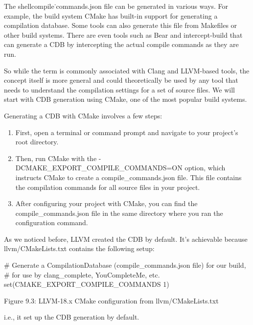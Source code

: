 The shellcompile˙commands.json file can be generated in various ways. For example, the build system CMake has built-in support for generating a compilation database. Some tools can also generate this file from Makefiles or other build systems. There are even tools such as Bear and intercept-build that can generate a CDB by intercepting the actual compile commands as they are run.

So while the term is commonly associated with Clang and LLVM-based tools, the concept itself is more general and could theoretically be used by any tool that needs to understand the compilation settings for a set of source files. We will start with CDB generation using CMake, one of the most popular build systems.


Generating a CDB with CMake involves a few steps:

\begin{enumerate}
\item
First, open a terminal or command prompt and navigate to your project's root directory.

\item
Then, run CMake with the -DCMAKE\_EXPORT\_COMPILE\_COMMANDS=ON option, which instructs CMake to create a compile\_commands.json file. This file contains the compilation commands for all source files in your project.

\item
After configuring your project with CMake, you can find the compile\_commands.json file in the same directory where you ran the configuration command.
\end{enumerate}

As we noticed before, LLVM created the CDB by default. It's achievable because llvm/CMakeLists.txt contains the following setup:

\begin{cmake}
# Generate a CompilationDatabase (compile_commands.json file) for our build,
# for use by clang_complete, YouCompleteMe, etc.
set(CMAKE_EXPORT_COMPILE_COMMANDS 1)
\end{cmake}

\begin{center}
Figure 9.3: LLVM-18.x CMake configuration from llvm/CMakeLists.txt
\end{center}

i.e., it set up the CDB generation by default.


